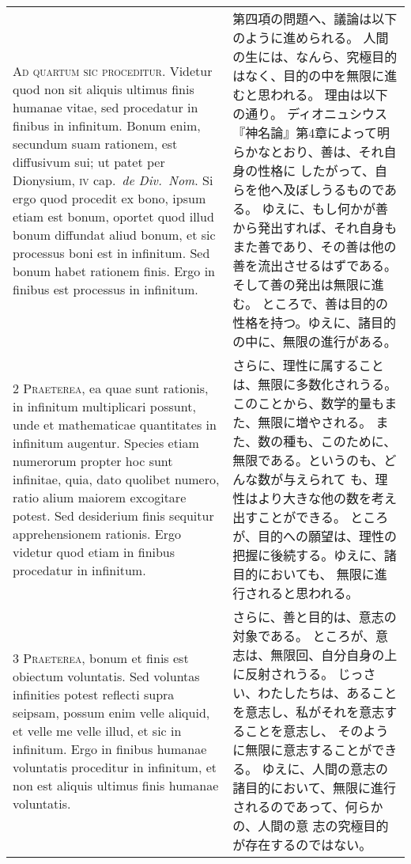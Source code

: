 \documentclass[10pt]{jsarticle} %
\begin{document}
\begin{longtable}{p{21em}p{21em}}


{\Huge A}{\scshape d quartum sic proceditur}. Videtur quod non sit
aliquis ultimus finis humanae vitae, sed procedatur in finibus in
infinitum. Bonum enim, secundum suam rationem, est diffusivum sui; ut
patet per Dionysium, {\scshape iv} cap.~{\itshape de Div.~Nom}. Si ergo
quod procedit ex bono, ipsum etiam est bonum, oportet quod illud bonum
diffundat aliud bonum, et sic processus boni est in infinitum. Sed bonum
habet rationem finis. Ergo in finibus est processus in infinitum.

&

第四項の問題へ、議論は以下のように進められる。
人間の生には、なんら、究極目的はなく、目的の中を無限に進むと思われる。
理由は以下の通り。
ディオニュシウス『神名論』第4章によって明らかなとおり、善は、それ自身の性格に
 したがって、自らを他へ及ぼしうるものである。
ゆえに、もし何かが善から発出すれば、それ自身もまた善であり、その善は他の
 善を流出させるはずである。そして善の発出は無限に進む。
ところで、善は目的の性格を持つ。ゆえに、諸目的の中に、無限の進行がある。

\\


{\scshape 2 Praeterea}, ea quae sunt rationis, in
infinitum multiplicari possunt, unde et mathematicae quantitates in
infinitum augentur. Species etiam numerorum propter hoc sunt infinitae,
quia, dato quolibet numero, ratio alium maiorem excogitare potest. Sed
desiderium finis sequitur apprehensionem rationis. Ergo videtur quod
etiam in finibus procedatur in infinitum.

&


さらに、理性に属することは、無限に多数化されうる。
このことから、数学的量もまた、無限に増やされる。
また、数の種も、このために、無限である。というのも、どんな数が与えられて
 も、理性はより大きな他の数を考え出すことができる。
ところが、目的への願望は、理性の把握に後続する。ゆえに、諸目的においても、
 無限に進行されると思われる。

\\


{\scshape 3 Praeterea}, bonum et finis est obiectum
voluntatis. Sed voluntas infinities potest reflecti supra seipsam,
possum enim velle aliquid, et velle me velle illud, et sic in
infinitum. Ergo in finibus humanae voluntatis proceditur in infinitum,
et non est aliquis ultimus finis humanae voluntatis.

&


さらに、善と目的は、意志の対象である。
ところが、意志は、無限回、自分自身の上に反射されうる。
じっさい、わたしたちは、あることを意志し、私がそれを意志することを意志し、
 そのように無限に意志することができる。
ゆえに、人間の意志の諸目的において、無限に進行されるのであって、何らかの、人間の意
 志の究極目的が存在するのではない。


\end{longtable}
\end{document}
